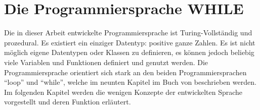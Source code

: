 \chapter{Die Programmiersprache WHILE} \label{chap:while}

Die in dieser Arbeit entwickelte Programmiersprache ist Turing-Vollständig und prozedural. Es existiert ein einziger Datentyp: positive ganze Zahlen. Es ist nicht möglich eigene Datentypen oder Klassen zu definieren, es können jedoch beliebig viele Variablen und Funktionen definiert und genutzt werden. Die Programmiersprache orientiert sich stark an den beiden Programmiersprachen \enquote{loop} und \enquote{while}, welche im neunten Kapitel im Buch  von \citeauthor{GottfriedVossen2016} beschrieben werden. \cite{GottfriedVossen2016} Im folgenden Kapitel werden die wenigen Konzepte der entwickelten Sprache vorgestellt und deren Funktion erläutert.

